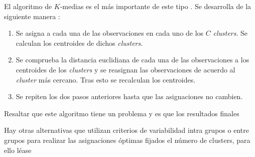 \noindent El algoritmo de $K$-medias es el más importante de este tipo \cite{Johnson 2007}. Se desarrolla de la siguiente manera  :
\begin{enumerate}
\item Se asigna a cada una de las observaciones en cada uno de los $C$ \emph{clusters}. Se calculan los centroides de dichos \emph{clusters}.
\item Se comprueba la distancia euclidiana de cada una de las observaciones a los centroides de los \emph{clusters} y se reasignan las observaciones de acuerdo al \emph{cluster} más cercano. Tras esto se recalculan los centroides.
\item Se repiten los dos pasos anteriores hasta que las asignaciones no cambien. 
\end{enumerate}

\noindent Resaltar que este algoritmo tiene un problema y es que los resultados finales 

\noindent Hay otras alternativas que utilizan criterios de variabilidad intra grupos o entre grupos para realizar las asignaciones óptimas fijados el número de clusters, para ello léase \cite{Everitt 2011, Peña 2002, Hartigan 1975}







